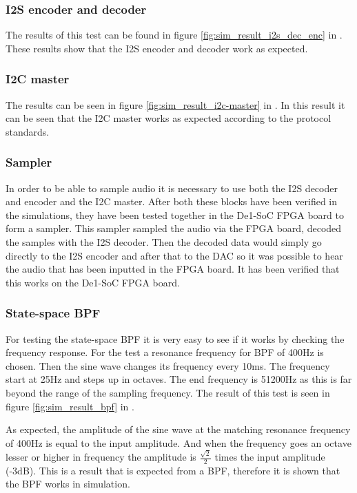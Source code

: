 \subsubsection{I2S encoder and decoder}
The results of this test can be found in figure \ref{fig:sim_result_i2s_dec_enc} in . These results show that the I2S encoder and decoder work as expected. 

\subsubsection{I2C master}
The results can be seen in figure \ref{fig:sim_result_i2c-master} in . In this result it can be seen that the I2C master works as expected according to the protocol standards.

\subsubsection{Sampler}
In order to be able to sample audio it is necessary to use both the I2S decoder and encoder and the I2C master. After both these blocks have been verified in the simulations, they have been tested together in the De1-SoC FPGA board to form a sampler. This sampler sampled the audio via the FPGA board, decoded the samples with the I2S decoder. Then the decoded data would simply go directly to the I2S encoder and after that to the DAC so it was possible to hear the audio that has been inputted in the FPGA board. It has been verified that this works on the De1-SoC FPGA board.

\subsubsection{State-space BPF}
For testing the state-space BPF it is very easy to see if it works by checking the frequency response. For the test a resonance frequency for BPF of 400Hz is chosen. Then the sine wave changes its frequency every 10ms. The frequency start at 25Hz and steps up in octaves. The end frequency is 51200Hz as this is far beyond the range of the sampling frequency. The result of this test is seen in figure \ref{fig:sim_result_bpf} in . 

As expected, the amplitude of the sine wave at the matching resonance frequency of 400Hz is equal to the input amplitude. And when the frequency goes an octave lesser or higher in frequency the amplitude is $\frac{\sqrt{2}}{2}$ times the input amplitude (-3dB). This is a result that is expected from a BPF, therefore it is shown that the BPF works in simulation.

